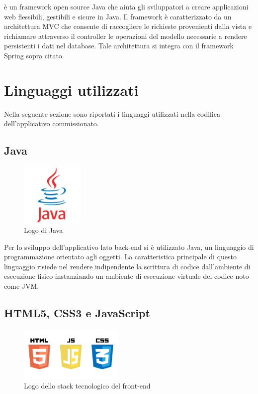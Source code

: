 \ap{{[b]}} è un framework open source Java che aiuta gli sviluppatori a creare applicazioni web flessibili, gestibili e sicure in Java. Il framework è caratterizzato da un architettura MVC che consente di raccogliere le richieste provenienti dalla vista e richiamare attraverso il controller le operazioni del modello necessarie a rendere persistenti i dati nel database. Tale architettura si integra con il framework Spring sopra citato.

\pagebreak

\section{Linguaggi utilizzati}
Nella seguente sezione sono riportati i linguaggi utilizzati nella codifica dell'applicativo commissionato.

\subsection{Java}

\begin{figure}[!h]
	\centering
	\includegraphics[width=3cm]{../images/Java-logo.png}
	\caption{Logo di Java}
\end{figure}

\noindent Per lo sviluppo dell'applicativo lato back-end si è utilizzato Java, un linguaggio di programmazione orientato agli oggetti. La caratteristica principale di questo linguaggio risiede nel rendere indipendente la scrittura di codice dall'ambiente di esecuzione fisico instanziando un ambiente di esecuzione virtuale del codice noto come JVM.

\subsection{HTML5, CSS3 e JavaScript}

\begin{figure}[!h]
	\centering
	\includegraphics[width=5cm]{../images/HTML5-logo.png}
	\caption{Logo dello stack tecnologico del front-end}
\end{figure}

